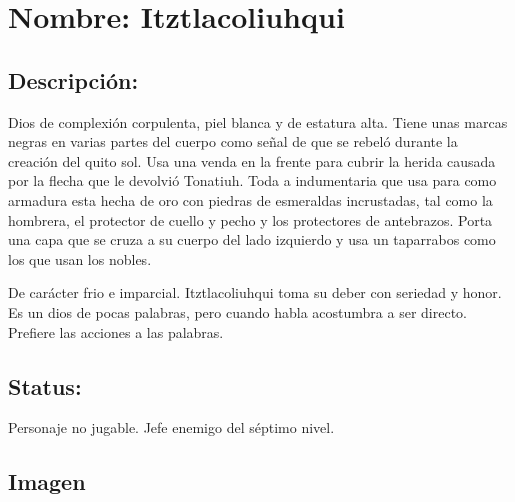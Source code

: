 \section{Nombre: Itztlacoliuhqui}  \label{per:itztlacoliuhqui}

\subsection{Descripción:}
Dios de complexión corpulenta, piel blanca y de estatura alta. Tiene unas marcas negras en varias partes del cuerpo como señal de que se rebeló durante la creación del quito sol. Usa una venda en la frente para cubrir la herida causada por la flecha que le devolvió Tonatiuh. Toda a indumentaria que usa para como armadura esta hecha de oro con piedras de esmeraldas incrustadas, tal como la hombrera, el protector de cuello y pecho y los protectores de antebrazos. Porta una capa que se cruza a su cuerpo del lado izquierdo y usa un taparrabos como los que usan los nobles.
\\
\par
De carácter frio e imparcial. Itztlacoliuhqui toma su deber con seriedad y honor. Es un dios de pocas palabras, pero cuando habla acostumbra a ser directo. Prefiere las acciones a las palabras. 
\subsection{Status:}
Personaje no jugable.
Jefe enemigo del séptimo nivel.	  
\subsection{Imagen}
